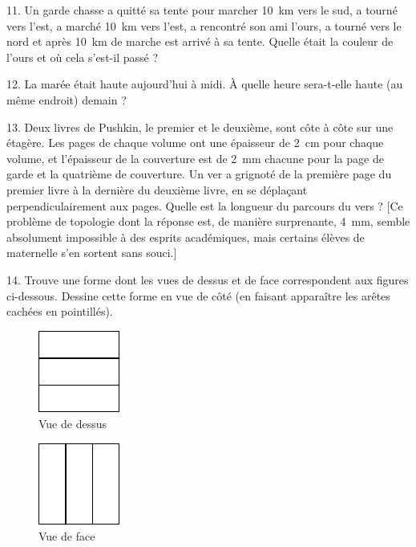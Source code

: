 \begin{problem}{11.}
	Un garde chasse a quitté sa tente pour marcher \SI{10}{\km} vers le sud, a tourné vers l'est, 
	a marché \SI{10}{\km} vers l'est,
	a rencontré son ami l'ours, a tourné vers le nord et après \SI{10}{\km} de marche est arrivé à sa tente. 
	Quelle était la couleur de l'ours et où cela s'est-il passé ?
\end{problem}

\begin{problem}{12.}
	La marée était haute aujourd'hui à midi. À quelle heure sera-t-elle haute (au même endroit) demain ?
\end{problem}

\begin{problem}{13.}
	Deux livres de Pushkin, le premier et le deuxième, sont côte à côte sur une étagère.
	Les pages de chaque volume ont une épaisseur de \SI{2}{\cm} pour chaque volume, 
	et l'épaisseur de la couverture est de \SI{2}{\mm} chacune pour la page de garde et la quatrième 
	de couverture. 
	Un ver a grignoté de la première page du premier livre à la dernière du deuxième livre, en 
	se déplaçant perpendiculairement aux pages.
	Quelle est la longueur du parcours du vers ?
	[Ce problème de topologie dont la réponse est, de manière surprenante, \SI{4}{\mm}, semble 
	absolument impossible à des esprits académiques, mais certains élèves de maternelle
	s'en sortent sans souci.]
\end{problem}

\begin{problem}{14.}
	Trouve une forme dont les vues de dessus et de face correspondent aux figures ci-dessous.
	Dessine cette forme en vue de côté (en faisant apparaître les arêtes cachées en pointillés).
	\begin{figure}
		\footnotesize
		\null\hfill
		\parbox{0.2\linewidth}{\centering\includegraphics{resources/taskbook-99}\\Vue de dessus}
		\hfill
		\parbox{0.2\linewidth}{\centering\includegraphics{resources/taskbook-98}\\Vue de face}
		\hfill\null
	\end{figure}
\end{problem}

